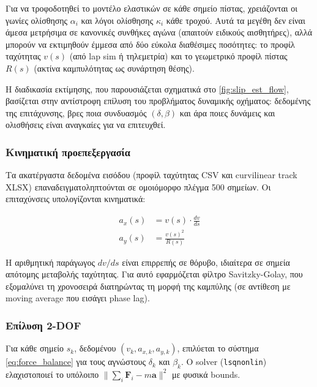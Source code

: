 
\label{subsec:slip_estimation}

Για να τροφοδοτηθεί το μοντέλο ελαστικών σε κάθε σημείο πίστας, χρειάζονται οι γωνίες
ολίσθησης $\alpha_i$ και λόγοι ολίσθησης $\kappa_i$ κάθε τροχού. Αυτά τα μεγέθη δεν είναι
άμεσα μετρήσιμα σε κανονικές συνθήκες αγώνα (απαιτούν ειδικούς αισθητήρες), αλλά μπορούν
να εκτιμηθούν έμμεσα από δύο εύκολα διαθέσιμες ποσότητες: το προφίλ ταχύτητας $v(s)$ (από
lap sim ή τηλεμετρία) και το γεωμετρικό προφίλ πίστας $R(s)$ (ακτίνα καμπυλότητας ως
συνάρτηση θέσης).

Η διαδικασία εκτίμησης, που παρουσιάζεται σχηματικά στο \cref{fig:slip_est_flow},
βασίζεται στην αντίστροφη επίλυση του προβλήματος δυναμικής οχήματος: δεδομένης της
επιτάχυνσης, βρες ποια συνδυασμός $(\delta, \beta)$ και άρα ποιες δυνάμεις και ολισθήσεις
είναι αναγκαίες για να επιτευχθεί.

\subsubsection{Κινηματική προεπεξεργασία}

Τα ακατέργαστα δεδομένα εισόδου (προφίλ ταχύτητας CSV και curvilinear track XLSX)
επαναδειγματολη­πτούνται σε ομοιόμορφο πλέγμα 500 σημείων. Οι επιταχύνσεις υπολογίζονται
κινηματικά:

\begin{align}
    a_x(s) &= v(s) \cdot \frac{dv}{ds}  \label{eq:ax_chain2} \\
    a_y(s) &= \frac{v(s)^2}{R(s)}       \label{eq:ay_centripetal2}
\end{align}

Η αριθμητική παράγωγος $dv/ds$ είναι επιρρεπής σε θόρυβο, ιδιαίτερα σε σημεία απότομης
μεταβολής ταχύτητας. Για αυτό εφαρμόζεται φίλτρο Savitzky-Golay, που εξομαλύνει τη
χρονοσειρά διατηρώντας τη μορφή της καμπύλης (σε αντίθεση με moving average που εισάγει
phase lag).



\subsubsection{Επίλυση 2-DOF}

Για κάθε σημείο $s_k$, δεδομένου $(v_k, a_{x,k}, a_{y,k})$, επιλύεται το σύστημα
\cref{eq:force_balance} για τους αγνώστους $\delta_k$ και $\beta_k$. Ο solver
(\texttt{lsqnonlin}) ελαχιστοποιεί το υπόλοιπο $\|\sum_i \mathbf{F}_i - m\mathbf{a}\|^2$
με φυσικά bounds.

